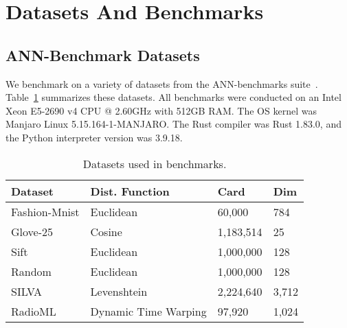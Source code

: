 \section{Datasets And Benchmarks}
\label{sec:datasets-and-benchmarks}

\subsection{ANN-Benchmark Datasets}
\label{sec:datasets-and-benchmarks:ann-benchmark-datasets}

We benchmark on a variety of datasets from the ANN-benchmarks suite~\cite{aumuller2020ann}.
Table~\ref{tab:datasets:summary} summarizes these datasets.
All benchmarks were conducted on an Intel Xeon E5-2690 v4 CPU @ 2.60GHz with 512GB RAM.
The OS kernel was Manjaro Linux 5.15.164-1-MANJARO.
The Rust compiler was Rust 1.83.0, and the Python interpreter version was 3.9.18.

\begin{table}
    \caption{Datasets used in benchmarks.}
    \label{tab:datasets:summary}
    \begin{center}
        \begin{sc}
            \begin{tabular}{|l|l|l|l|}
                \hline
                \textbf{Dataset} & \textbf{Dist. Function}  &\textbf{Card}  & \textbf{Dim}  \\
                \hline
                Fashion-Mnist    & Euclidean                   & 60,000             & 784                    \\
                \hline
                Glove-25         & Cosine                      & 1,183,514          & 25                     \\
                \hline
                Sift             & Euclidean                   & 1,000,000          & 128                    \\
                \hline
                Random           & Euclidean                   & 1,000,000          & 128                    \\
                \hline
                SILVA            & Levenshtein                 & 2,224,640          & 3,712         \\
                \hline
                RadioML          & Dynamic Time Warping        & 97,920             & 1,024                  \\
                \hline
            \end{tabular}
        \end{sc}
    \end{center}
    \vskip -0.1in
\end{table}

